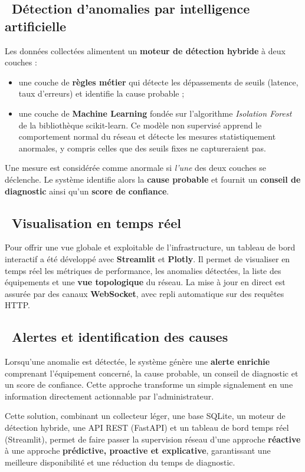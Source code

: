 \documentclass[12pt,a4paper]{report}
\newcommand{\diamonditem}{\ding{117}}   %
\begin{document}
\subsection*{\diamonditem\ Détection d'anomalies par intelligence artificielle}
Les données collectées alimentent un \textbf{moteur de détection hybride} à deux
couches :
\begin{itemize}[leftmargin=*,nosep]
\item une couche de \textbf{règles métier} qui détecte les dépassements de seuils
(latence, taux d'erreurs) et identifie la cause probable ;
\item une couche de \textbf{Machine Learning} fondée sur l'algorithme
\textit{Isolation Forest} de la bibliothèque scikit-learn. Ce modèle
non supervisé apprend le comportement normal du réseau et détecte les mesures
statistiquement anormales, y compris celles que des seuils fixes ne captureraient
pas.
\end{itemize}
Une mesure est considérée comme anormale si \emph{l'une} des deux couches se
déclenche. Le système identifie alors la \textbf{cause probable} et fournit un
\textbf{conseil de diagnostic} ainsi qu'un \textbf{score de confiance}.

\subsection*{\diamonditem\ Visualisation en temps réel}
Pour offrir une vue globale et exploitable de l'infrastructure, un tableau de bord
interactif a été développé avec \textbf{Streamlit} et \textbf{Plotly}. Il permet de
visualiser en temps réel les métriques de performance, les anomalies détectées, la
liste des équipements et une \textbf{vue topologique} du réseau. La mise à jour en
direct est assurée par des canaux \textbf{WebSocket}, avec repli automatique sur des
requêtes HTTP.

\subsection*{\diamonditem\ Alertes et identification des causes}
Lorsqu'une anomalie est détectée, le système génère une \textbf{alerte enrichie}
comprenant l'équipement concerné, la cause probable, un conseil de diagnostic et un
score de confiance. Cette approche transforme un simple signalement en une
information directement actionnable par l'administrateur.

Cette solution, combinant un collecteur léger, une base SQLite, un moteur de
détection hybride, une API REST (FastAPI) et un tableau de bord temps réel
(Streamlit), permet de faire passer la supervision réseau d'une approche
\textbf{réactive} à une approche \textbf{prédictive, proactive et explicative},
garantissant une meilleure disponibilité et une réduction du temps de diagnostic.
\end{document}
